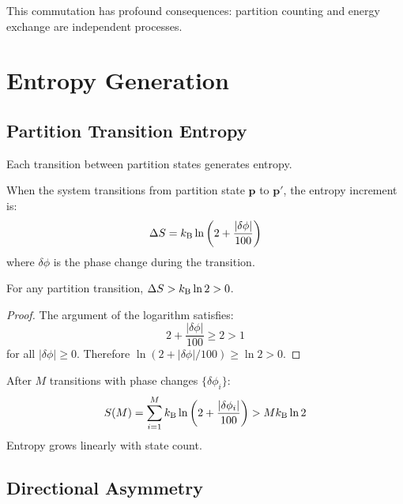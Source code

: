 This commutation has profound consequences: partition counting and energy exchange are independent processes.



\section{Entropy Generation}
\label{sec:entropy}

\subsection{Partition Transition Entropy}

Each transition between partition states generates entropy.

\begin{definition}
\label{def:entropy}
When the system transitions from partition state $\mathbf{p}$ to $\mathbf{p}'$, the entropy increment is:
\begin{equation}
    \Delta S = k_{\mathrm{B}} \ln\left(2 + \frac{|\delta\phi|}{100}\right)
\end{equation}
where $\delta\phi$ is the phase change during the transition.
\end{definition}

\begin{theorem}
\label{thm:positive}
For any partition transition, $\Delta S > k_{\mathrm{B}} \ln 2 > 0$.
\end{theorem}

\begin{proof}
The argument of the logarithm satisfies:
\begin{equation}
    2 + \frac{|\delta\phi|}{100} \geq 2 > 1
\end{equation}
for all $|\delta\phi| \geq 0$. Therefore $\ln(2 + |\delta\phi|/100) \geq \ln 2 > 0$.
\end{proof}

\begin{corollary}
After $M$ transitions with phase changes $\{\delta\phi_i\}$:
\begin{equation}
    S(M) = \sum_{i=1}^{M} k_{\mathrm{B}} \ln\left(2 + \frac{|\delta\phi_i|}{100}\right) > M k_{\mathrm{B}} \ln 2
\end{equation}
Entropy grows linearly with state count.
\end{corollary}

\subsection{Directional Asymmetry}

